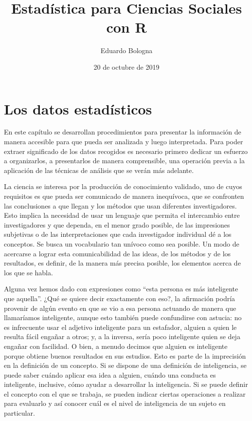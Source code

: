 \documentclass[]{book}
\title{Estadística para Ciencias Sociales con R}
\author{Eduardo Bologna}
\date{20 de octubre de 2019}
\begin{document}
\maketitle

{
\hypersetup{linkcolor=black}
\setcounter{tocdepth}{1}
\tableofcontents
}
\listoftables
\listoffigures
\hypertarget{section}{%
\chapter*{}\label{section}}

\hypertarget{los-datos-estaduxedsticos}{%
\chapter{Los datos estadísticos}\label{los-datos-estaduxedsticos}}

En este capítulo se desarrollan procedimientos para presentar la información de manera accesible para que pueda ser analizada y luego interpretada. Para poder extraer significado de los datos recogidos es necesario primero dedicar un esfuerzo a organizarlos, a presentarlos de manera comprensible, una operación previa a la aplicación de las técnicas de análisis que se verán más adelante.

La ciencia se interesa por la producción de conocimiento validado, uno de cuyos requisitos es que pueda ser comunicado de manera inequívoca, que se confronten las conclusiones a que llegan y los métodos que usan diferentes investigadores. Esto implica la necesidad de usar un lenguaje que permita el intercambio entre investigadores y que dependa, en el menor grado posible, de las impresiones subjetivas o de las interpretaciones que cada investigador individual dé a los conceptos. Se busca un vocabulario tan unívoco como sea posible. Un modo de acercarse a lograr esta comunicabilidad de las ideas, de los métodos y de los resultados, es definir, de la manera más precisa posible, los elementos acerca de los que se habla.

Alguna vez hemos dado con expresiones como ``esta persona es más inteligente que aquella''. ¿Qué se quiere decir exactamente con eso?, la afirmación podría provenir de algún evento en que se vio a esa persona actuando de manera que llamaríamos inteligente, aunque esto también puede confundirse con astucia: no es infrecuente usar el adjetivo inteligente para un estafador, alguien a quien le resulta fácil engañar a otros; y, a la inversa, sería poco inteligente quien se deja engañar con facilidad. O bien, a menudo decimos que alguien es inteligente porque obtiene buenos resultados en sus estudios. Esto es parte de la imprecisión en la definición de un concepto. Si se dispone de una definición de inteligencia, se puede saber cuándo aplicar esa idea a alguien, cuándo una conducta es inteligente, inclusive, cómo ayudar a desarrollar la inteligencia. Si se puede definir el concepto con el que se trabaja, se pueden indicar ciertas operaciones a realizar para evaluarlo y así conocer cuál es el nivel de inteligencia de un sujeto en particular.
\end{document}

